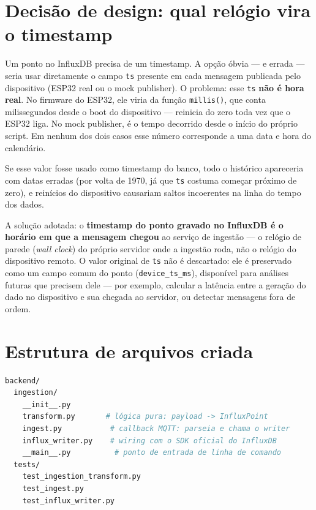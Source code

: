 \documentclass[11pt,a4paper]{article}
\begin{document}
\section{Decisão de design: qual relógio vira o timestamp}
\label{sec:timestamp}

Um ponto no InfluxDB precisa de um timestamp. A opção óbvia --- e errada --- seria usar diretamente o campo \texttt{ts} presente em cada mensagem publicada pelo dispositivo (ESP32 real ou o mock publisher). O problema: esse \texttt{ts} \textbf{não é hora real}. No firmware do ESP32, ele viria da função \texttt{millis()}, que conta milissegundos desde o boot do dispositivo --- reinicia do zero toda vez que o ESP32 liga. No mock publisher, é o tempo decorrido desde o início do próprio script. Em nenhum dos dois casos esse número corresponde a uma data e hora do calendário.

Se esse valor fosse usado como timestamp do banco, todo o histórico apareceria com datas erradas (por volta de 1970, já que \texttt{ts} costuma começar próximo de zero), e reinícios do dispositivo causariam saltos incoerentes na linha do tempo dos dados.

A solução adotada: o \textbf{timestamp do ponto gravado no InfluxDB é o horário em que a mensagem chegou} ao serviço de ingestão --- o relógio de parede (\textit{wall clock}) do próprio servidor onde a ingestão roda, não o relógio do dispositivo remoto. O valor original de \texttt{ts} não é descartado: ele é preservado como um campo comum do ponto (\texttt{device\_ts\_ms}), disponível para análises futuras que precisem dele --- por exemplo, calcular a latência entre a geração do dado no dispositivo e sua chegada ao servidor, ou detectar mensagens fora de ordem.

\section{Estrutura de arquivos criada}

\begin{lstlisting}[language=bash,caption={Estrutura do diretório backend/ingestion/}]
backend/
  ingestion/
    __init__.py
    transform.py       # lógica pura: payload -> InfluxPoint
    ingest.py           # callback MQTT: parseia e chama o writer
    influx_writer.py    # wiring com o SDK oficial do InfluxDB
    __main__.py          # ponto de entrada de linha de comando
  tests/
    test_ingestion_transform.py
    test_ingest.py
    test_influx_writer.py
\end{lstlisting}
\end{document}
